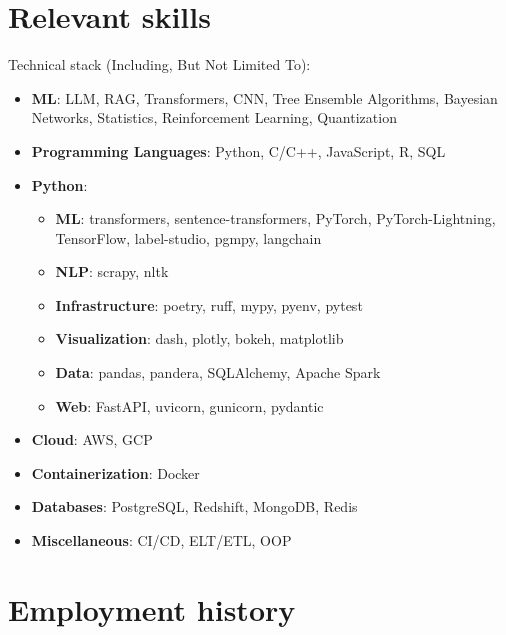 \documentclass[10pt,a4paper]{article}
\newcommand{\verticalSpace}{0.3cm}
\begin{document}
	
	\section*{Relevant skills}
Technical stack (Including, But Not Limited To): 
\begin{itemize}
    \item \textbf{ML}: LLM, RAG, Transformers, CNN, Tree Ensemble Algorithms, Bayesian Networks, Statistics, Reinforcement Learning, Quantization
    \item \textbf{Programming Languages}: Python, C/C++, JavaScript, R, SQL
    \item \textbf{Python}:
        \begin{itemize}
            \item \textbf{ML}: transformers, sentence-transformers, PyTorch, PyTorch-Lightning, TensorFlow, label-studio, pgmpy, langchain
            \item \textbf{NLP}: scrapy, nltk
            \item \textbf{Infrastructure}: poetry, ruff, mypy, pyenv, pytest
            \item \textbf{Visualization}: dash, plotly, bokeh, matplotlib
            \item \textbf{Data}: pandas, pandera, SQLAlchemy, Apache Spark
            \item \textbf{Web}: FastAPI, uvicorn, gunicorn, pydantic
        \end{itemize}
    \item \textbf{Cloud}: AWS, GCP
    \item \textbf{Containerization}: Docker
    \item \textbf{Databases}: PostgreSQL, Redshift, MongoDB, Redis
    \item \textbf{Miscellaneous}: CI/CD, ELT/ETL, OOP
    
\end{itemize}
	\setlength{\parindent}{3em}


	

\newpage


	\setlength{\parindent}{0em}
	\vspace{\verticalSpace}
	\section*{Employment history}
\end{document}
